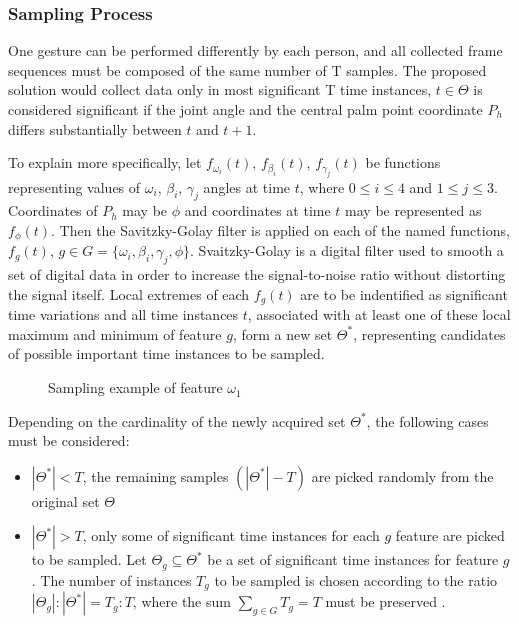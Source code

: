 \subsubsection{Sampling Process}

One gesture can be performed differently by each person, and all collected frame sequences must be composed of the same number of T samples. The proposed solution would collect data only in most significant T time instances, $t \in \Theta$ is considered significant if the joint angle and the central palm point coordinate $P_h$ differs substantially between $t$ and $t+1$.

To explain more specifically, let $f_{\omega_i}(t)$, $f_{\beta_i}(t)$, $f_{\gamma_j}(t)$ be functions representing values of $\omega_i$, $\beta_i$, $\gamma_j$ angles at time $t$, where $0 \leq i \leq 4$ and $1 \leq j \leq 3$. Coordinates of $P_h$ may be $\phi$ and coordinates at time $t$ may be represented as $f_{\phi}(t)$. Then the Savitzky-Golay filter \cite{savitzkty} is applied on each of the named functions, $f_g(t)$, $g \in G = \{\omega_i,\beta_i, \gamma_j, \phi\}$. Svaitzky-Golay is a digital filter used to smooth a set of digital data in order to increase the signal-to-noise ratio without distorting the signal itself. Local extremes of each $f_g(t)$ are to be indentified as significant time variations and all time instances $t$, associated with at least one of these local maximum and minimum of feature $g$, form a new set $\Theta^*$, representing candidates of possible important time instances to be sampled. 

\begin{figure}[h]
	\centering
    \qquad
    \caption{Sampling example of feature $\omega_1$}
\end{figure}

Depending on the cardinality of the newly acquired set $\Theta^*$, the following cases must be considered:

\begin{itemize}
	\item $|\Theta^*| < T$, the remaining samples $(|\Theta^*|-T)$ are picked randomly from the original set $\Theta$
	\item $|\Theta^*| > T$, only some of significant time instances for each $g$ feature are picked to be sampled. Let $\Theta_g \subseteq \Theta^*$ be a set of significant time instances for feature $g$. The number of instances $T_g$ to be sampled is chosen according to the ratio $|\Theta_g|:|\Theta^*| = T_g:T$, where the sum $\sum_{g \in G}{T_g} = T$ must be preserved \cite{avola}.
\end{itemize}


